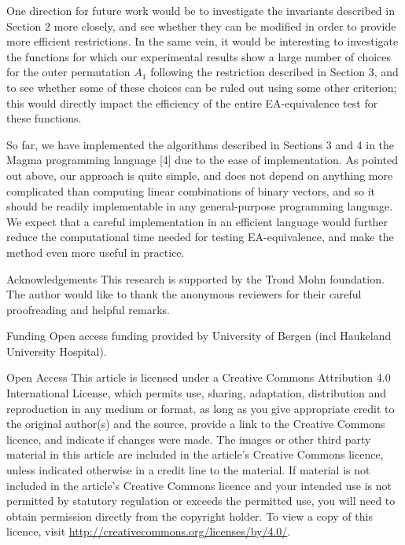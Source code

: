 \documentclass[10pt]{article}
\begin{document}
One direction for future work would be to investigate the invariants described in Section 2 more closely, and see whether they can be modified in order to provide more efficient restrictions. In the same vein, it would be interesting to investigate the functions for which our experimental results show a large number of choices for the outer permutation $A_{1}$ following the restriction described in Section 3, and to see whether some of these choices can be ruled out using some other criterion; this would directly impact the efficiency of the entire EA-equivalence test for these functions.

So far, we have implemented the algorithms described in Sections 3 and 4 in the Magma programming language [4] due to the ease of implementation. As pointed out above, our approach is quite simple, and does not depend on anything more complicated than computing linear combinations of binary vectors, and so it should be readily implementable in any general-purpose programming language. We expect that a careful implementation in an efficient language would further reduce the computational time needed for testing EA-equivalence, and make the method even more useful in practice.

Acknowledgements This research is supported by the Trond Mohn foundation. The author would like to thank the anonymous reviewers for their careful proofreading and helpful remarks.

Funding Open access funding provided by University of Bergen (incl Haukeland University Hospital).

Open Access This article is licensed under a Creative Commons Attribution 4.0 International License, which permits use, sharing, adaptation, distribution and reproduction in any medium or format, as long as you give appropriate credit to the original author(s) and the source, provide a link to the Creative Commons licence, and indicate if changes were made. The images or other third party material in this article are included in the article's Creative Commons licence, unless indicated otherwise in a credit line to the material. If material is not included in the article's Creative Commons licence and your intended use is not permitted by statutory regulation or exceeds the permitted use, you will need to obtain permission directly from the copyright holder. To view a copy of this licence, visit \href{http://creativecommons.org/licenses/by/4.0/}{http://creativecommons.org/licenses/by/4.0/}.
\end{document}
